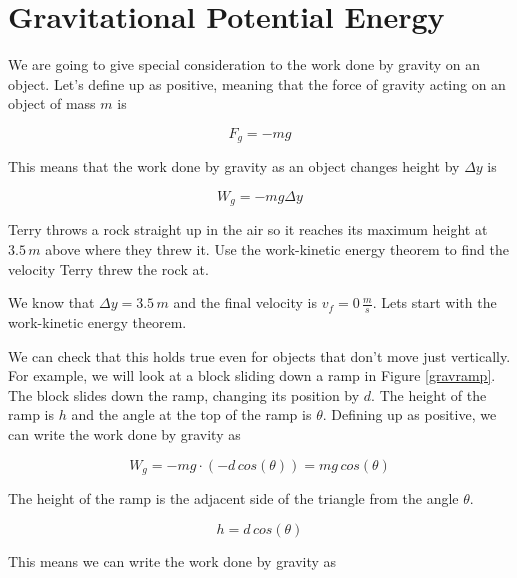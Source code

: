 \documentclass[12pt]{book}
\begin{document}
\section{Gravitational Potential Energy}

We are going to give special consideration to the work done by gravity on an object. Let's define up as positive, meaning that the force of gravity acting on an object of mass $m$ is

\begin{equation}
F_g = -mg
\end{equation}

This means that the work done by gravity as an object changes height by $\Delta y$ is

\begin{equation}
W_g = -mg \Delta y
\end{equation}

\begin{exampleblock}

Terry throws a rock straight up in the air so it reaches its maximum height at $3.5 \, m$ above where they threw it. Use the work-kinetic energy theorem to find the velocity Terry threw the rock at.

\hspace{10pt}

We know that $\Delta y = 3.5 \, m$ and the final velocity is $v_f = 0 \, \frac{m}{s}$. Lets start with the work-kinetic energy theorem.

\end{exampleblock}

We can check that this holds true even for objects that don't move just vertically. For example, we will look at a block sliding down a ramp in Figure \ref{gravramp}. The block slides down the ramp, changing its position by $d$. The height of the ramp is $h$ and the angle at the top of the ramp is $\theta$. Defining up as positive, we can write the work done by gravity as 

\begin{equation}
W_g = -mg \cdot (-d \, cos(\theta)) = mg \, cos(\theta)
\end{equation}

The height of the ramp is the adjacent side of the triangle from the angle $\theta$.

\begin{equation}
h = d \, cos(\theta)
\end{equation}

This means we can write the work done by gravity as
\end{document}
